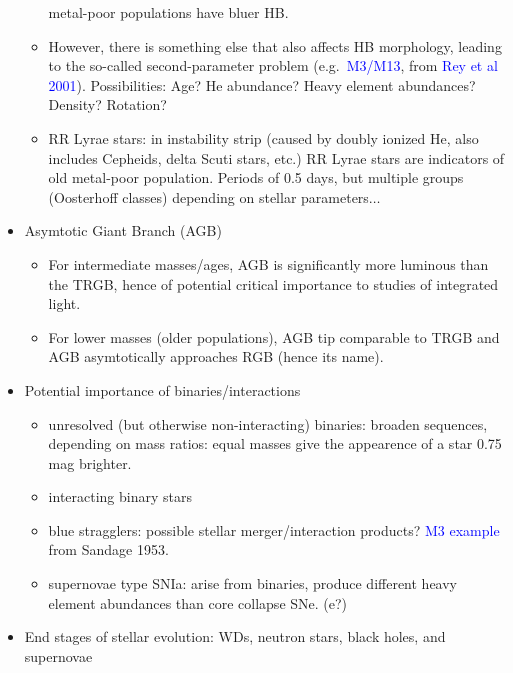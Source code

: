 \documentclass{article}
\begin{document}
\begin{itemize}
\begin{itemize}
                metal-poor populations have bluer HB.
            \item However, there is something else that also affects HB
                morphology, leading to the so-called second-parameter problem
                (e.g.\ \textcolor{blue}{M3/M13}, from \textcolor{blue}{Rey et al
                2001}). Possibilities: Age? He abundance? Heavy element
                abundances? Density? Rotation?
            \item RR Lyrae stars: in instability strip (caused by doubly
                ionized He, also includes Cepheids, delta Scuti stars, etc.)
                RR Lyrae stars are indicators of old metal-poor population.
                Periods of 0.5 days, but multiple groups (Oosterhoff classes)
                depending on stellar parameters$\ldots$
        \end{itemize}
    \item Asymtotic Giant Branch (AGB)
        \begin{itemize}
            \item For intermediate masses/ages, AGB is significantly more
                luminous than the TRGB, hence of potential critical importance
                to studies of integrated light.
            \item For lower masses (older populations), AGB tip comparable
                to TRGB and AGB asymtotically approaches RGB (hence its name).
        \end{itemize}
    \item Potential importance of binaries/interactions
        \begin{itemize}
            \item unresolved (but otherwise non-interacting) binaries:
                broaden sequences, depending on mass ratios: equal masses
                give the appearence of a star 0.75 mag brighter.
            \item interacting binary stars
            \item blue stragglers: possible stellar merger/interaction products?
                \textcolor{blue}{M3 example} from Sandage 1953.
            \item supernovae type SNIa: arise from binaries, produce different
                heavy element abundances than core collapse SNe. (e?)
        \end{itemize}
    \item End stages of stellar evolution:
        WDs, neutron stars, black holes, and supernovae

\end{itemize}
\end{document}
